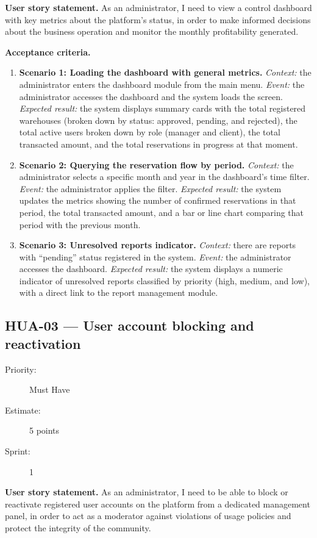 \documentclass[11pt,a4paper,oneside]{report}
\begin{document}
\textbf{User story statement.} As an administrator, I need to view a control dashboard with key metrics about the platform's status, in order to make informed decisions about the business operation and monitor the monthly profitability generated.

\textbf{Acceptance criteria.}
\begin{enumerate}
\item \textbf{Scenario 1: Loading the dashboard with general metrics.} \emph{Context:} the administrator enters the dashboard module from the main menu. \emph{Event:} the administrator accesses the dashboard and the system loads the screen. \emph{Expected result:} the system displays summary cards with the total registered warehouses (broken down by status: approved, pending, and rejected), the total active users broken down by role (manager and client), the total transacted amount, and the total reservations in progress at that moment.
\item \textbf{Scenario 2: Querying the reservation flow by period.} \emph{Context:} the administrator selects a specific month and year in the dashboard's time filter. \emph{Event:} the administrator applies the filter. \emph{Expected result:} the system updates the metrics showing the number of confirmed reservations in that period, the total transacted amount, and a bar or line chart comparing that period with the previous month.
\item \textbf{Scenario 3: Unresolved reports indicator.} \emph{Context:} there are reports with ``pending'' status registered in the system. \emph{Event:} the administrator accesses the dashboard. \emph{Expected result:} the system displays a numeric indicator of unresolved reports classified by priority (high, medium, and low), with a direct link to the report management module.
\end{enumerate}

\subsection{HUA-03 --- User account blocking and reactivation}
\label{req:HUA-03}
\begin{description}
\item[Priority:] Must Have \quad \item[Estimate:] 5 points \quad \item[Sprint:] 1
\end{description}

\textbf{User story statement.} As an administrator, I need to be able to block or reactivate registered user accounts on the platform from a dedicated management panel, in order to act as a moderator against violations of usage policies and protect the integrity of the community.
\end{document}
